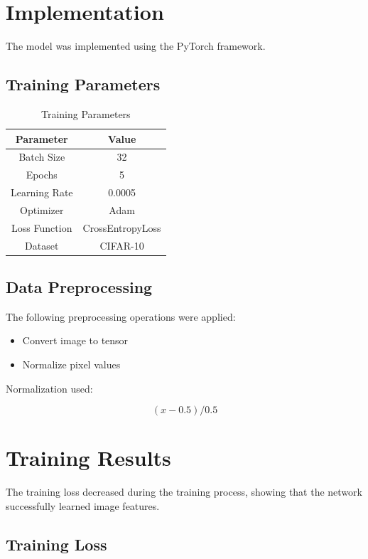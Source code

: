 \documentclass[12pt]{article}
\begin{document}
\section{Implementation}

The model was implemented using the PyTorch framework.

\subsection{Training Parameters}

\begin{table}[H]
\centering
\begin{tabular}{cc}
\toprule
Parameter & Value \\
\midrule
Batch Size & 32 \\
Epochs & 5 \\
Learning Rate & 0.0005 \\
Optimizer & Adam \\
Loss Function & CrossEntropyLoss \\
Dataset & CIFAR-10 \\
\bottomrule
\end{tabular}
\caption{Training Parameters}
\end{table}

\subsection{Data Preprocessing}

The following preprocessing operations were applied:

\begin{itemize}
    \item Convert image to tensor
    \item Normalize pixel values
\end{itemize}

Normalization used:

\[
(x - 0.5) / 0.5
\]

\section{Training Results}

The training loss decreased during the training process, showing that the network successfully learned image features.

\subsection{Training Loss}
\end{document}
